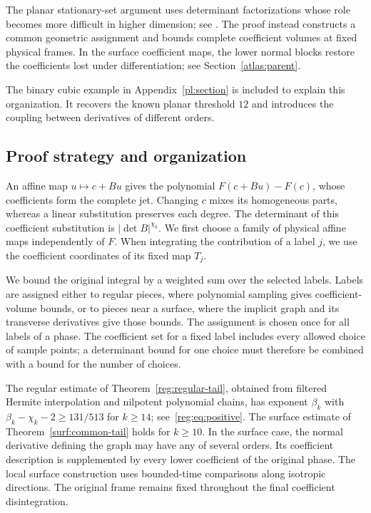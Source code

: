 \documentclass[11pt]{amsart}
\theoremstyle{definition}
\theoremstyle{remark}
\numberwithin{equation}{section}
\begin{document}
The planar stationary-set argument uses determinant factorizations whose role becomes more difficult in higher dimension; see \cite[Remark 5.11]{BGZZK}. The proof instead constructs a common geometric assignment and bounds complete coefficient volumes at fixed physical frames. In the surface coefficient maps, the lower normal blocks restore the coefficients lost under differentiation; see Section~\ref{atlas:parent}.

The binary cubic example in Appendix~\ref{pl:section} is included to explain this organization. It recovers the known planar threshold $12$ and introduces the coupling between derivatives of different orders.

\subsection{Proof strategy and organization}\label{intro:strategy}

An affine map $u\mapsto c+Bu$ gives the polynomial $F(c+Bu)-F(c)$, whose coefficients form the complete jet. Changing $c$ mixes its homogeneous parts, whereas a linear substitution preserves each degree. The determinant of this coefficient substitution is $|\det B|^{\chi_k}$. We first choose a family of physical affine maps independently of $F$. When integrating the contribution of a label $j$, we use the coefficient coordinates of its fixed map $T_j$.

We bound the original integral by a weighted sum over the selected labels. Labels are assigned either to regular pieces, where polynomial sampling gives coefficient-volume bounds, or to pieces near a surface, where the implicit graph and its transverse derivatives give those bounds. The assignment is chosen once for all labels of a phase. The coefficient set for a fixed label includes every allowed choice of sample points; a determinant bound for one choice must therefore be combined with a bound for the number of choices.

The regular estimate of Theorem~\ref{reg:regular-tail}, obtained from filtered Hermite interpolation and nilpotent polynomial chains, has exponent $\beta_k$ with $\beta_k-\chi_k-2\ge131/513$ for $k\ge14$; see~\eqref{reg:eq:positive}. The surface estimate of Theorem~\ref{surf:common-tail} holds for $k\ge10$. In the surface case, the normal derivative defining the graph may have any of several orders. Its coefficient description is supplemented by every lower coefficient of the original phase. The local surface construction uses bounded-time comparisons along isotropic directions. The original frame remains fixed throughout the final coefficient disintegration.
\end{document}
